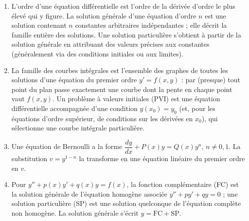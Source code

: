 \documentclass[11pt]{article}
\newcommand{\cle}[1]{{\popxbold\color{popdark}#1}}
\begin{document}
\begin{corrige}
\begin{enumerate}
\item L'\cle{ordre} d'une équation différentielle est l'ordre de la dérivée d'ordre le plus élevé qui y figure. La \cle{solution générale} d'une équation d'ordre $n$ est une solution contenant $n$ constantes arbitraires indépendantes ; elle décrit la famille entière des solutions. Une \cle{solution particulière} s'obtient à partir de la solution générale en attribuant des valeurs précises aux constantes (généralement via des conditions initiales ou aux limites).
\item La \cle{famille des courbes intégrales} est l'ensemble des graphes de toutes les solutions d'une équation du premier ordre $y' = f(x,y)$ : par (presque) tout point du plan passe exactement une courbe dont la pente en chaque point vaut $f(x,y)$. Un \cle{problème à valeurs initiales} (PVI) est une équation différentielle accompagnée d'une condition $y(x_{0}) = y_{0}$ (et, pour les équations d'ordre supérieur, de conditions sur les dérivées en $x_{0}$), qui sélectionne une courbe intégrale particulière.
\item Une \cle{équation de Bernoulli} a la forme $\dfrac{dy}{dx} + P(x)y = Q(x)y^{n}$, $n \neq 0, 1$. La substitution $v = y^{1-n}$ la transforme en une équation linéaire du premier ordre en $v$.
\item Pour $y'' + p(x)y' + q(x)y = f(x)$, la \cle{fonction complémentaire} (FC) est la solution générale de l'équation homogène associée $y'' + py' + qy = 0$ ; une \cle{solution particulière} (SP) est une solution quelconque de l'équation complète non homogène. La solution générale s'écrit $y = \text{FC} + \text{SP}$.
\end{enumerate}
\end{corrige}
\end{document}
